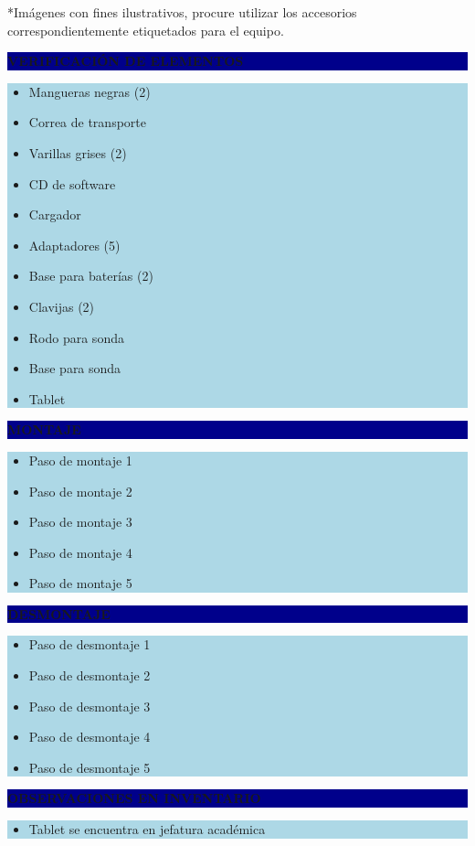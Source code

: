 \documentclass[11pt]{article}
\newcommand{\seccionbanda}[1]{%
  \vspace{0.6em}
  \noindent\colorbox{darkblue}{\parbox{\dimexpr\linewidth-2\fboxsep}{%
    \centering\color{white}\bfseries #1}}\par\vspace{0.6em}
}
\begin{document}
\vspace{0.5em}
\footnotesize{*Imágenes con fines ilustrativos, procure utilizar los accesorios correspondientemente etiquetados para el equipo.}
\normalsize

\newpage
\seccionbanda{VERIFICACIÓN DE ELEMENTOS}
\noindent\colorbox{lightblue}{\parbox{\dimexpr\linewidth-2\fboxsep\relax}{%
\begin{itemize}[label=$\square$, itemsep=4pt]
\item Mangueras negras (2)
\item Correa de transporte
\item Varillas grises (2)
\item CD de software
\item Cargador
\item Adaptadores (5)
\item Base para baterías (2)
\item Clavijas (2)
\item Rodo para sonda
\item Base para sonda
\item Tablet
\end{itemize}
}}\par

\seccionbanda{MONTAJE}
\noindent\colorbox{lightblue}{\parbox{\dimexpr\linewidth-2\fboxsep\relax}{%
\begin{itemize}[label=$\square$, itemsep=4pt]
\item Paso de montaje 1
\item Paso de montaje 2
\item Paso de montaje 3
\item Paso de montaje 4
\item Paso de montaje 5
\end{itemize}
}}\par

\seccionbanda{DESMONTAJE}
\noindent\colorbox{lightblue}{\parbox{\dimexpr\linewidth-2\fboxsep\relax}{%
\begin{itemize}[label=$\square$, itemsep=4pt]
\item Paso de desmontaje 1
\item Paso de desmontaje 2
\item Paso de desmontaje 3
\item Paso de desmontaje 4
\item Paso de desmontaje 5
\end{itemize}
}}\par
\seccionbanda{OBSERVACIONES EN INVENTARIO}
\noindent\colorbox{lightblue}{\parbox{\dimexpr\linewidth-2\fboxsep\relax}{\begin{itemize}[itemsep=4pt]
\item Tablet se encuentra en jefatura académica
\end{itemize}}}\par
\end{document}
